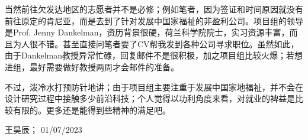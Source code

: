 当然前往欠发达地区的志愿者并不是必修；例如笔者，因为签证和时间原因就没有前往原定的肯尼亚，而是去到了针对发展中国家福祉的非盈利公司。项目组的领导是Prof. Jenny Dankelman，资历背景很硬，荷兰科学院院士，实习资源丰富，而且为人很不错。甚至直接问笔者要了CV帮我发到各种公司寻求职位。虽然如此，由于Dankelman教授异常忙碌，回复邮件不是很积极，加之项目组比较火爆；若想进组，最好需要做好教授两周才会邮件的准备。

不过，泼冷水打预防针地讲；由于项目组主要注重于发展中国家地福祉，并不会在设计研究过程中接触多少前沿科技；个人觉得以功利角度来看，对就业的裨益是比较有限的。更多还是能得到些精神的满足吧。
\begin{flushright}
王昊辰； 01/07/2023
\end{flushright}





